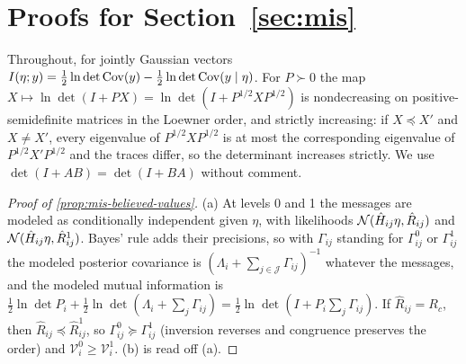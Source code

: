 \section{Proofs for \texorpdfstring{Section~\ref{sec:mis}}{misreading}}\label{app:mis}

Throughout, for jointly Gaussian vectors $I(\eta;y)=\tfrac12\ln\det\operatorname{Cov}(y)-\tfrac12\ln\det\operatorname{Cov}(y\mid\eta)$. For $P\succ0$ the map $X\mapsto\ln\det(I+PX)=\ln\det(I+P^{1/2}XP^{1/2})$ is nondecreasing on positive-semidefinite matrices in the Loewner order, and strictly increasing: if $X\preceq X'$ and $X\neq X'$, every eigenvalue of $P^{1/2}XP^{1/2}$ is at most the corresponding eigenvalue of $P^{1/2}X'P^{1/2}$ and the traces differ, so the determinant increases strictly. We use $\det(I+AB)=\det(I+BA)$ without comment.

\begin{proof}[Proof of \cref{prop:mis-believed-values}]
(a) At levels 0 and 1 the messages are modeled as conditionally independent given $\eta$, with likelihoods $\mathcal{N}(\hat H_{ij}\eta,\hat R_{ij})$ and $\mathcal{N}(\hat H_{ij}\eta,\hat R^1_{ij})$. Bayes' rule adds their precisions, so with $\Gamma_{ij}$ standing for $\Gamma^0_{ij}$ or $\Gamma^1_{ij}$ the modeled posterior covariance is $(\Lambda_i+\sum_{j\in\mathcal J}\Gamma_{ij})^{-1}$ whatever the messages, and the modeled mutual information is $\tfrac12\ln\det P_i+\tfrac12\ln\det(\Lambda_i+\sum_j\Gamma_{ij})=\tfrac12\ln\det(I+P_i\sum_j\Gamma_{ij})$. If $\hat R_{ij}=R_c$, then $\hat R_{ij}\preceq\hat R^1_{ij}$, so $\Gamma^0_{ij}\succeq\Gamma^1_{ij}$ (inversion reverses and congruence preserves the order) and $\mathcal V^0_i\ge\mathcal V^1_i$. (b) is read off (a).


\end{proof}
